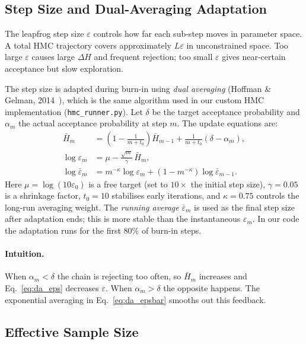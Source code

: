 \documentclass{article}
\begin{document}
\subsection{Step Size and Dual-Averaging Adaptation}

The leapfrog step size $\varepsilon$ controls how far each sub-step moves in parameter space.
A total HMC trajectory covers approximately $L\varepsilon$ in unconstrained space.  Too large
$\varepsilon$ causes large $\Delta H$ and frequent rejection; too small $\varepsilon$ gives
near-certain acceptance but slow exploration.

The step size is adapted during burn-in using \emph{dual averaging} (Hoffman \& Gelman,
2014~\cite{hoffman2014nuts}), which is the same algorithm used in our custom HMC implementation
(\texttt{hmc\_runner.py}).  Let $\delta$ be the target acceptance probability and $\alpha_m$ the
actual acceptance probability at step $m$.  The update equations are:
\begin{align}
  \bar{H}_m &= \left(1 - \frac{1}{m + t_0}\right)\bar{H}_{m-1}
              + \frac{1}{m + t_0}(\delta - \alpha_m),
              \label{eq:da_hbar}\\[4pt]
  \log \varepsilon_m &= \mu - \frac{\sqrt{m}}{\gamma}\,\bar{H}_m,
              \label{eq:da_eps}\\[4pt]
  \log \bar{\varepsilon}_m &= m^{-\kappa}\log \varepsilon_m
              + (1 - m^{-\kappa})\log \bar{\varepsilon}_{m-1}.
              \label{eq:da_epsbar}
\end{align}
Here $\mu = \log(10\varepsilon_0)$ is a free target (set to $10\times$ the initial step size),
$\gamma = 0.05$ is a shrinkage factor, $t_0 = 10$ stabilises early iterations, and $\kappa = 0.75$
controls the long-run averaging weight.  The \emph{running average} $\bar{\varepsilon}_m$ is
used as the final step size after adaptation ends; this is more stable than the instantaneous
$\varepsilon_m$.  In our code the adaptation runs for the first $80\%$ of burn-in steps.

\paragraph{Intuition.}
When $\alpha_m < \delta$ the chain is rejecting too often, so $\bar{H}_m$ increases and
Eq.~\eqref{eq:da_eps} decreases $\varepsilon$.  When $\alpha_m > \delta$ the opposite happens.
The exponential averaging in Eq.~\eqref{eq:da_epsbar} smooths out this feedback.

\subsection{Effective Sample Size}
\end{document}
